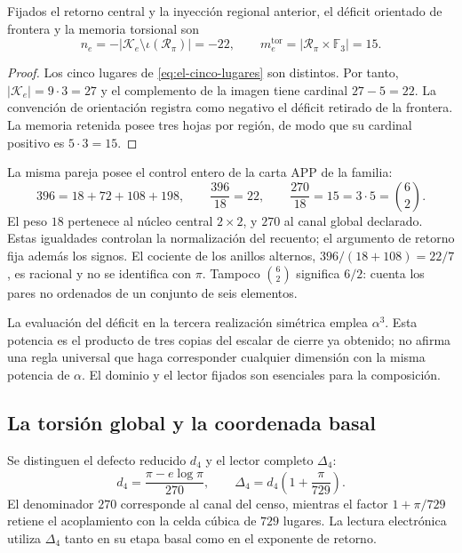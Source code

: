 \begin{proposition}
Fijados el retorno central y la inyección regional anterior, el déficit
orientado de frontera y la memoria torsional son
\begin{equation}
 n_e=-|\mathcal K_e\setminus\iota(\mathscr R_\pi)|=-22,
 \qquad
 m_e^{\mathrm{tor}}=|\mathscr R_\pi\times\mathbb F_3|=15.
 \label{eq:el-selector-enteros}
\end{equation}
\end{proposition}
\begin{proof}
Los cinco lugares de \eqref{eq:el-cinco-lugares} son distintos. Por
tanto, \(|\mathcal K_e|=9\cdot3=27\) y el complemento de la imagen
tiene cardinal \(27-5=22\). La convención de orientación registra como
negativo el déficit retirado de la frontera. La memoria retenida posee
tres hojas por región, de modo que su cardinal positivo es
\(5\cdot3=15\).
\end{proof}

La misma pareja posee el control entero de la carta APP de la familia:
\begin{equation}
 396=18+72+108+198,
 \qquad \frac{396}{18}=22,
 \qquad \frac{270}{18}=15=3\cdot5=\binom62.
 \label{eq:el-censo}
\end{equation}
El peso \(18\) pertenece al núcleo central \(2\times2\), y \(270\)
al canal global declarado. Estas igualdades controlan la normalización
del recuento; el argumento de retorno fija además los signos. El
cociente de los anillos alternos,
\(396/(18+108)=22/7\), es racional y no se identifica con \(\pi\).
Tampoco \(\binom62\) significa \(6/2\): cuenta los pares no ordenados
de un conjunto de seis elementos.

La evaluación del déficit en la tercera realización simétrica emplea
\(\alpha^3\). Esta potencia es el producto de tres copias del escalar
de cierre ya obtenido; no afirma una regla universal que haga
corresponder cualquier dimensión con la misma potencia de \(\alpha\).
El dominio y el lector fijados son esenciales para la composición.

\subsection{La torsión global y la coordenada basal}

\begin{definition}
Se distinguen el defecto reducido \(d_4\) y el lector completo
\(\Delta_4\):
\begin{equation}
 d_4=\frac{\pi-e\log\pi}{270},\qquad
 \Delta_4=d_4\left(1+\frac{\pi}{729}\right).
 \label{eq:el-delta}
\end{equation}
El denominador \(270\) corresponde al canal del censo, mientras el
factor \(1+\pi/729\) retiene el acoplamiento con la celda cúbica de
\(729\) lugares. La lectura electrónica utiliza \(\Delta_4\) tanto en
su etapa basal como en el exponente de retorno.
\end{definition}

